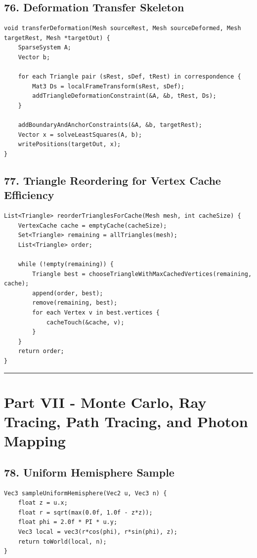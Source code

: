 \documentclass[10pt,letterpaper]{article}
\begin{document}
\subsection{76. Deformation Transfer Skeleton}

\begin{verbatim}
void transferDeformation(Mesh sourceRest, Mesh sourceDeformed, Mesh targetRest, Mesh *targetOut) {
    SparseSystem A;
    Vector b;

    for each Triangle pair (sRest, sDef, tRest) in correspondence {
        Mat3 Ds = localFrameTransform(sRest, sDef);
        addTriangleDeformationConstraint(&A, &b, tRest, Ds);
    }

    addBoundaryAndAnchorConstraints(&A, &b, targetRest);
    Vector x = solveLeastSquares(A, b);
    writePositions(targetOut, x);
}
\end{verbatim}

\subsection{77. Triangle Reordering for Vertex Cache Efficiency}

\begin{verbatim}
List<Triangle> reorderTrianglesForCache(Mesh mesh, int cacheSize) {
    VertexCache cache = emptyCache(cacheSize);
    Set<Triangle> remaining = allTriangles(mesh);
    List<Triangle> order;

    while (!empty(remaining)) {
        Triangle best = chooseTriangleWithMaxCachedVertices(remaining, cache);
        append(order, best);
        remove(remaining, best);
        for each Vertex v in best.vertices {
            cacheTouch(&cache, v);
        }
    }
    return order;
}
\end{verbatim}

\medskip\hrule\medskip

\clearpage
\section{Part VII - Monte Carlo, Ray Tracing, Path Tracing, and Photon Mapping}

\subsection{78. Uniform Hemisphere Sample}

\begin{verbatim}
Vec3 sampleUniformHemisphere(Vec2 u, Vec3 n) {
    float z = u.x;
    float r = sqrt(max(0.0f, 1.0f - z*z));
    float phi = 2.0f * PI * u.y;
    Vec3 local = vec3(r*cos(phi), r*sin(phi), z);
    return toWorld(local, n);
}
\end{verbatim}
\end{document}
